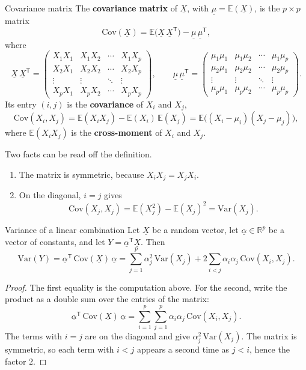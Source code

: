 \documentclass[a4paper,12pt,oneside]{report}
\begin{document}
\begin{frameddefn}{Covariance matrix}\label{def:covariance}
The \textbf{covariance matrix} of $\underline{X}$, with
$\underline{\mu}=\mathbb{E}(\underline{X})$, is the $p\times p$ matrix
\[
\mathrm{Cov}(\underline{X})=\mathbb{E}\big(\underline{X}\,\underline{X}^{\mathsf T}\big)-\underline{\mu}\,\underline{\mu}^{\mathsf T},
\]
where
\[
\underline{X}\,\underline{X}^{\mathsf T}=\begin{pmatrix}X_1X_1&X_1X_2&\cdots&X_1X_p\\X_2X_1&X_2X_2&\cdots&X_2X_p\\\vdots&\vdots&\ddots&\vdots\\X_pX_1&X_pX_2&\cdots&X_pX_p\end{pmatrix},
\qquad
\underline{\mu}\,\underline{\mu}^{\mathsf T}=\begin{pmatrix}\mu_1\mu_1&\mu_1\mu_2&\cdots&\mu_1\mu_p\\\mu_2\mu_1&\mu_2\mu_2&\cdots&\mu_2\mu_p\\\vdots&\vdots&\ddots&\vdots\\\mu_p\mu_1&\mu_p\mu_2&\cdots&\mu_p\mu_p\end{pmatrix}.
\]
Its entry $(i,j)$ is the \textbf{covariance} of $X_i$ and $X_j$,
\[
\mathrm{Cov}(X_i,X_j)=\mathbb{E}(X_iX_j)-\mathbb{E}(X_i)\,\mathbb{E}(X_j)
=\mathbb{E}\big((X_i-\mu_i)(X_j-\mu_j)\big),
\]
where $\mathbb{E}(X_iX_j)$ is the \textbf{cross-moment} of $X_i$ and $X_j$.
\end{frameddefn}

Two facts can be read off the definition.
\begin{enumerate}
\item The matrix is symmetric, because $X_iX_j=X_jX_i$.
\item On the diagonal, $i=j$ gives
\[
\mathrm{Cov}(X_j,X_j)=\mathbb{E}(X_j^2)-\mathbb{E}(X_j)^2=\mathrm{Var}(X_j).
\]
\end{enumerate}

\begin{framedprop}{Variance of a linear combination}\label{prop:var-linear}
Let $\underline{X}$ be a random vector, let $\underline{\alpha}\in\mathbb{R}^p$
be a vector of constants, and let $Y=\underline{\alpha}^{\mathsf T}\underline{X}$.
Then
\[
\mathrm{Var}(Y)=\underline{\alpha}^{\mathsf T}\,\mathrm{Cov}(\underline{X})\,\underline{\alpha}
=\sum_{j=1}^p\alpha_j^2\,\mathrm{Var}(X_j)+2\sum_{i<j}\alpha_i\alpha_j\,\mathrm{Cov}(X_i,X_j).
\]
\end{framedprop}

\begin{proof}
The first equality is the computation above. For the second, write the
product as a double sum over the entries of the matrix:
\[
\underline{\alpha}^{\mathsf T}\,\mathrm{Cov}(\underline{X})\,\underline{\alpha}
=\sum_{i=1}^p\sum_{j=1}^p\alpha_i\alpha_j\,\mathrm{Cov}(X_i,X_j).
\]
The terms with $i=j$ are on the diagonal and give
$\alpha_j^2\,\mathrm{Var}(X_j)$. The matrix is symmetric, so each term with
$i<j$ appears a second time as $j<i$, hence the factor $2$.
\end{proof}
\end{document}
